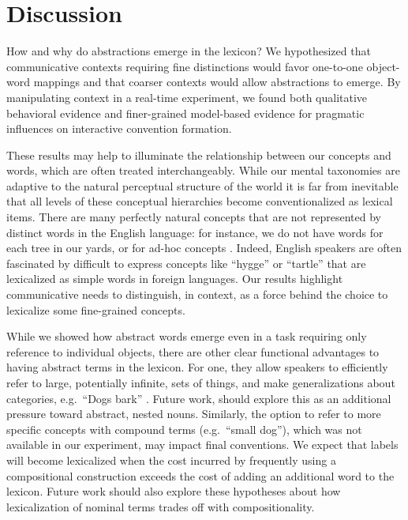\documentclass[10pt,letterpaper]{article}
\begin{document}

\section{Discussion}

How and why do abstractions emerge in the lexicon? We hypothesized that communicative contexts requiring fine distinctions would favor one-to-one object-word mappings and that coarser contexts would allow abstractions to emerge. By manipulating context in a real-time experiment, we found both qualitative behavioral evidence and finer-grained model-based evidence for pragmatic influences on interactive convention formation.

These results may help to illuminate the relationship between our concepts and words, which are often treated interchangeably. While our mental taxonomies are adaptive to the natural perceptual structure of the world \cite{MervisRosch81_CategorizationReview} %
it is far from inevitable that all levels of these conceptual hierarchies become conventionalized as lexical items. There are many perfectly natural concepts that are not represented by distinct words in the English language: for instance, we do not have words for each tree in our yards, or for ad-hoc concepts %
\cite{Barsalou83_AdHocCategories}. Indeed, English speakers are often fascinated by difficult to express concepts like ``hygge'' or ``tartle'' that are lexicalized as simple words in foreign languages.
Our results highlight communicative needs to distinguish, in context, as a force behind the choice to lexicalize some fine-grained concepts.

While we showed how abstract words emerge even in a task requiring only reference to individual objects, there are other clear functional advantages to having abstract terms in the lexicon. For one, they allow speakers to efficiently refer to large, potentially infinite, sets of things, and make generalizations about categories, e.g.\ ``Dogs bark'' \cite{TesslerGoodman16_Generics}. Future work, should explore this as an additional pressure toward abstract, nested nouns.
Similarly, the option to refer to more specific concepts with compound terms (e.g.~``small dog''), which was not available in our experiment, may impact final conventions.
We expect that labels will become lexicalized when the cost incurred by frequently using a compositional construction exceeds the cost of adding an additional word to the lexicon. 
Future work should also explore these hypotheses about how lexicalization of nominal terms trades off with compositionality. 
\end{document}
